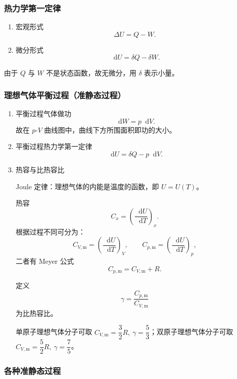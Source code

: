 \documentclass[UTF8,fontset=fandol,zihao=5]{ctexart}
\newcommand{\dif}{\mathop{}\!\mathrm{d}}
\begin{document}
\subsubsection{热力学第一定律}

\begin{enumerate}
  \item 宏观形式
  \[
    \Delta U=Q-W.
  \]
  \item 微分形式
  \[
    \dif U=\delta Q-\delta W.
  \]
\end{enumerate}

由于 \(Q\) 与 \(W\) 不是状态函数，故无微分，用 \(\delta\) 表示小量。

\subsubsection{理想气体平衡过程（准静态过程）}

\begin{enumerate}
  \item 平衡过程气体做功
  \[
    \dif W=p\dif V.
  \]
  故在 \(p\)-\(V\) 曲线图中，曲线下方所围面积即功的大小。

  \item 平衡过程热力学第一定律
  \[
    \dif U=\delta Q-p\dif V.
  \]

  \item 热容与比热容比

  Joule 定律：理想气体的内能是温度的函数，即 \(U=U(T)\)。

  热容
  \[
    C_x=\left(\frac{\dif U}{\dif T}\right)_x.
  \]
  根据过程不同可分为：
  \[
    C_{V,\mathrm m}=\left(\frac{\dif U}{\dif T}\right)_V,
    \qquad
    C_{p,\mathrm m}=\left(\frac{\dif U}{\dif T}\right)_p,
  \]
  二者有 Meyer 公式
  \[
    C_{p,\mathrm m}=C_{V,\mathrm m}+R.
  \]

  定义
  \[
    \gamma=\frac{C_{p,\mathrm m}}{C_{V,\mathrm m}}
  \]
  为比热容比。

  单原子理想气体分子可取 \(C_{V,\mathrm m}=\dfrac32R,\ \gamma=\dfrac53\)；双原子理想气体分子可取 \(C_{V,\mathrm m}=\dfrac52R,\ \gamma=\dfrac75\)。
\end{enumerate}

\subsubsection{各种准静态过程}
\end{document}
